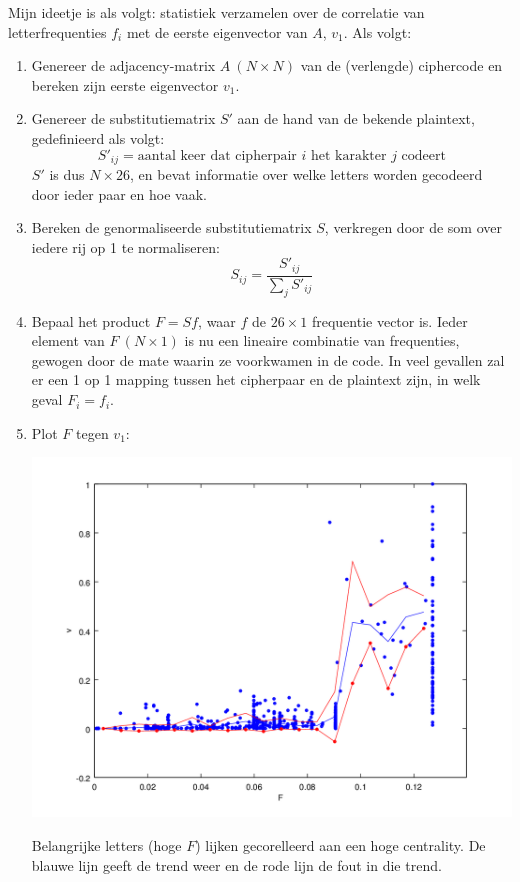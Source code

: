 \documentclass{article}
\begin{document}
Mijn ideetje is als volgt: statistiek verzamelen over de correlatie van letterfrequenties $f_i$ met de eerste eigenvector van $A$, $v_1$. Als volgt:

\begin{enumerate}
\item Genereer de adjacency-matrix $A\:(N\times N)$ van de (verlengde) ciphercode en bereken zijn eerste eigenvector $v_1$.
\item Genereer de substitutiematrix $S'$ aan de hand van de bekende plaintext, gedefinieerd als volgt: 
$$
    S'_{ij} = \text{aantal keer dat cipherpair $i$ het karakter $j$ codeert}
$$
$S'$ is dus $N\times 26$, en bevat informatie over welke letters worden gecodeerd door ieder paar en hoe vaak.
\item Bereken de genormaliseerde substitutiematrix $S$, verkregen door de som over iedere rij op 1 te normaliseren:
$$
    S_{ij} = \frac{S'_{ij}}{\sum_j S'_{ij}}
$$
\item Bepaal het product $F = Sf$, waar $f$ de $26\times 1$ frequentie vector is. Ieder element van $F\:(N\times 1)$ is nu een lineaire combinatie van frequenties, gewogen door de mate waarin ze voorkwamen in de code. In veel gevallen zal er een 1 op 1 mapping tussen het cipherpaar en de plaintext zijn, in welk geval $F_i = f_i$.

\item Plot $F$ tegen $v_1$:\\
\begin{minipage}{\textwidth}
    \begin{center}
        \includegraphics[width=\textwidth]{non_random_correlation}
    \end{center}
\end{minipage}
Belangrijke letters (hoge $F$) lijken gecorelleerd aan een hoge centrality. De blauwe lijn geeft de trend weer en de rode lijn de fout in die trend.


\end{enumerate}
\end{document}
